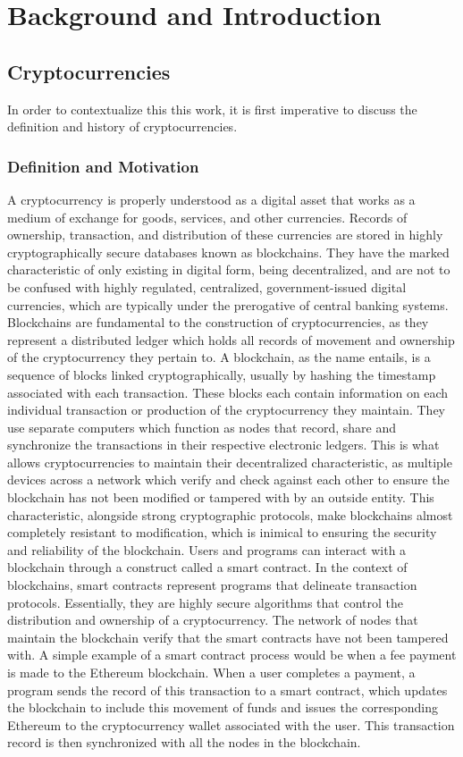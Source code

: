 \documentclass[bsc,frontabs,singlespacing,parskip,deptreport]{infthesis}
\begin{document}
\chapter{Background and Introduction}
    \section{Cryptocurrencies}
    In order to contextualize this this work, it is first imperative to discuss the definition and history of cryptocurrencies. 
    \subsection{Definition and Motivation}
    A cryptocurrency is properly understood as a digital asset that works as a medium of exchange for goods, services, and other currencies. Records of ownership, transaction, and distribution of these currencies are stored in highly cryptographically secure databases known as blockchains. They have the marked characteristic of only existing in digital form, being decentralized, and are not to be confused with highly regulated, centralized, government-issued digital currencies, which are typically under the prerogative of central banking systems. 
    \smallbreak
    \noindent
    Blockchains are fundamental to the construction of cryptocurrencies, as they represent a distributed ledger which holds all records of movement and ownership of the cryptocurrency they pertain to. A blockchain, as the name entails, is a sequence of blocks linked cryptographically, usually by hashing the timestamp associated with each transaction. These blocks each contain information on each individual transaction or production of the cryptocurrency they maintain. They use separate computers which function as nodes that record, share and synchronize the transactions in their respective electronic ledgers. This is what allows cryptocurrencies to maintain their decentralized characteristic, as multiple devices across a network which verify and check against each other to ensure the blockchain has not been modified or tampered with by an outside entity. This characteristic, alongside strong cryptographic protocols, make blockchains almost completely resistant to modification, which is inimical to ensuring the security and reliability of the blockchain. Users and programs can interact with a blockchain through a construct called a smart contract.
    \smallbreak
    \noindent
    In the context of blockchains, smart contracts represent programs that delineate transaction protocols. Essentially, they are highly secure algorithms that control the distribution and ownership of a cryptocurrency. The network of nodes that maintain the blockchain verify that the smart contracts have not been tampered with. A simple example of a smart contract process would be when a fee payment is made to the Ethereum blockchain. When a user completes a payment, a program sends the record of this transaction to a smart contract, which updates the blockchain to include this movement of funds and issues the corresponding Ethereum to the cryptocurrency wallet associated with the user. This transaction record is then synchronized with all the nodes in the blockchain.
    \smallbreak
\end{document}
